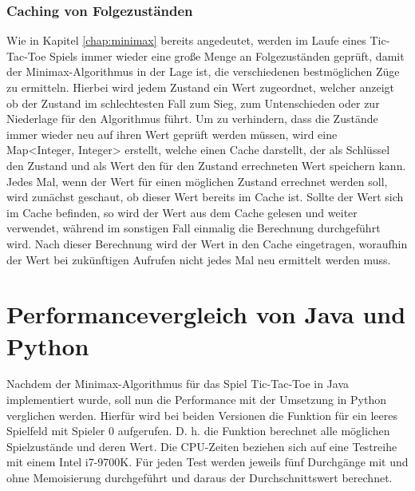 \subsubsection{Caching von Folgezuständen}
Wie in Kapitel \ref{chap:minimax} bereits angedeutet, werden im Laufe eines Tic-Tac-Toe Spiels immer wieder eine große Menge an Folgezuständen geprüft, 
damit der Minimax-Algorithmus in der Lage ist, die verschiedenen bestmöglichen Züge zu ermitteln. Hierbei wird jedem Zustand ein Wert zugeordnet, welcher
anzeigt ob der Zustand im schlechtesten Fall zum Sieg, zum Untenschieden oder zur Niederlage für den Algorithmus führt.
Um zu verhindern, dass die Zustände immer wieder neu auf ihren Wert geprüft werden müssen, wird eine Map<Integer, Integer> erstellt, welche einen
Cache darstellt, der als Schlüssel den Zustand und als Wert den für den Zustand errechneten Wert speichern kann. Jedes Mal, wenn der Wert für einen
möglichen Zustand errechnet werden soll, wird zunächst geschaut, ob dieser Wert bereits im Cache ist. Sollte der Wert sich im Cache befinden, so wird
der Wert aus dem Cache gelesen und weiter verwendet, während im sonstigen Fall einmalig die Berechnung durchgeführt wird. Nach dieser Berechnung wird der 
Wert in den Cache eingetragen, woraufhin der Wert bei zukünftigen Aufrufen nicht jedes Mal neu ermittelt werden muss.

\section{Performancevergleich von Java und Python}
\label{chap:performancevergleich}

Nachdem der Minimax-Algorithmus für das Spiel Tic-Tac-Toe in Java implementiert wurde, soll nun die 
Performance mit der Umsetzung in Python verglichen werden. Hierfür wird bei beiden Versionen die Funktion 
 für ein leeres Spielfeld mit Spieler 0 aufgerufen. D. h. die Funktion  berechnet 
alle möglichen Spielzustände und deren Wert. Die CPU-Zeiten beziehen sich auf eine Testreihe mit einem 
Intel i7-9700K. Für jeden Test werden jeweils fünf Durchgänge mit und ohne Memoisierung durchgeführt 
und daraus der Durchschnittswert berechnet.

